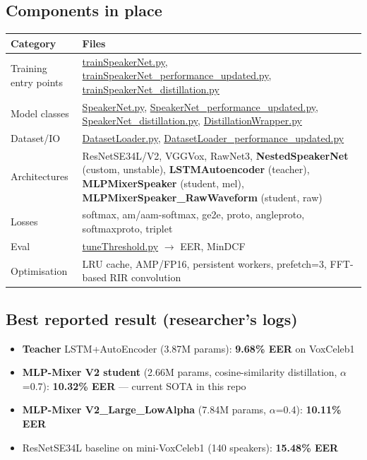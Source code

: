 \documentclass[10pt,a4paper]{article}
\renewcommand{\arraystretch}{1.15}
\begin{document}
\subsection*{Components in place}
\begin{center}
\small
\renewcommand{\arraystretch}{1.25}
\begin{tabularx}{\textwidth}{|Y|Y|}
\hline
Category & Files \\
\hline
Training entry points & \href{voxceleb_trainer/trainSpeakerNet.py}{trainSpeakerNet.py}, \href{voxceleb_trainer/trainSpeakerNet_performance_updated.py}{trainSpeakerNet\_performance\_updated.py}, \href{voxceleb_trainer/trainSpeakerNet_distillation.py}{trainSpeakerNet\_distillation.py} \\
\hline
Model classes & \href{voxceleb_trainer/SpeakerNet.py}{SpeakerNet.py}, \href{voxceleb_trainer/SpeakerNet_performance_updated.py}{SpeakerNet\_performance\_updated.py}, \href{voxceleb_trainer/SpeakerNet_distillation.py}{SpeakerNet\_distillation.py}, \href{voxceleb_trainer/DistillationWrapper.py}{DistillationWrapper.py} \\
\hline
Dataset/IO & \href{voxceleb_trainer/DatasetLoader.py}{DatasetLoader.py}, \href{voxceleb_trainer/DatasetLoader_performance_updated.py}{DatasetLoader\_performance\_updated.py} \\
\hline
Architectures & ResNetSE34L/V2, VGGVox, RawNet3, \textbf{NestedSpeakerNet} (custom, unstable), \textbf{LSTMAutoencoder} (teacher), \textbf{MLPMixerSpeaker} (student, mel), \textbf{MLPMixerSpeaker\_RawWaveform} (student, raw) \\
\hline
Losses & softmax, am/aam-softmax, ge2e, proto, angleproto, softmaxproto, triplet \\
\hline
Eval & \href{voxceleb_trainer/tuneThreshold.py}{tuneThreshold.py} $\rightarrow$ EER, MinDCF \\
\hline
Optimisation & LRU cache, AMP/FP16, persistent workers, prefetch=3, FFT-based RIR convolution \\
\hline
\end{tabularx}
\end{center}

\subsection*{Best reported result (researcher's logs)}
\begin{itemize}[leftmargin=*,itemsep=2pt]
  \item \textbf{Teacher} LSTM+AutoEncoder (3.87M params): \textbf{9.68\% EER} on VoxCeleb1
  \item \textbf{MLP-Mixer V2 student} (2.66M params, cosine-similarity distillation, $\alpha$=0.7): \textbf{10.32\% EER} --- current SOTA in this repo
  \item \textbf{MLP-Mixer V2\_Large\_LowAlpha} (7.84M params, $\alpha$=0.4): \textbf{10.11\% EER}
  \item ResNetSE34L baseline on mini-VoxCeleb1 (140 speakers): \textbf{15.48\% EER}
\end{itemize}
\end{document}
